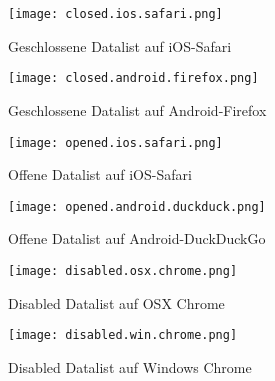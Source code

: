
\begin{figure}[!htb]
    \centering
    \begin{minipage}[b]{0.45\textwidth}
        \centering
        \texttt{[image: closed.ios.safari.png]}
        \caption{\centering Geschlossene Datalist auf iOS-Safari}
        \label{img:closedIosSafariDatalist}
    \end{minipage}
    \hfill
    \begin{minipage}[b]{0.45\textwidth}
        \centering
        \texttt{[image: closed.android.firefox.png]}
        \caption{\centering Geschlossene Datalist auf Android-Firefox}
        \label{img:closedAndroidFirefoxDatalist}
    \end{minipage}
\end{figure}

\begin{figure}[!htb]
    \centering
    \begin{minipage}[b]{0.45\textwidth}
        \centering
        \texttt{[image: opened.ios.safari.png]}
        \caption{\centering Offene Datalist auf iOS-Safari}
        \label{img:openedIosSafariDatalist}
    \end{minipage}
    \hfill
    \begin{minipage}[b]{0.45\textwidth}
        \centering
        \texttt{[image: opened.android.duckduck.png]}
        \caption{\centering Offene Datalist auf Android-DuckDuckGo}
        \label{img:openedAndroidDuckduckDatalist}
    \end{minipage}
\end{figure}


\begin{figure}[!htb]
    \centering
    \begin{minipage}[b]{0.45\textwidth}
        \centering
        \texttt{[image: disabled.osx.chrome.png]}
        \caption{\centering Disabled Datalist auf OSX Chrome}
        \label{img:disabledOsxChromeDatalist}
    \end{minipage}
    \hfill
    \begin{minipage}[b]{0.45\textwidth}
        \centering
        \texttt{[image: disabled.win.chrome.png]}
        \caption{\centering Disabled Datalist auf Windows Chrome}
        \label{img:disabledWinChromeDatalist}
    \end{minipage}
\end{figure}

